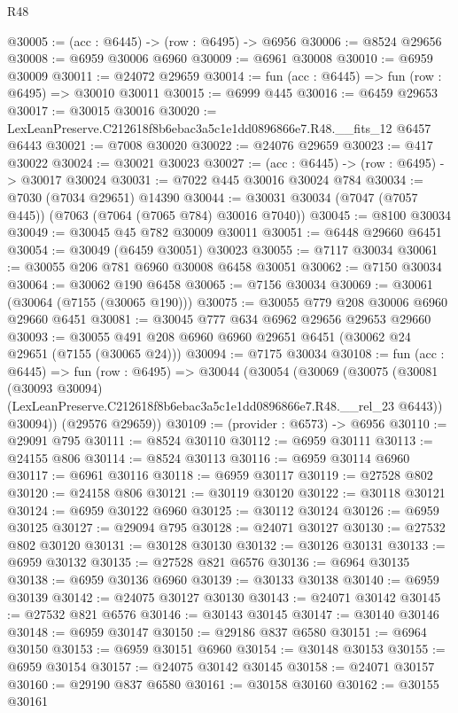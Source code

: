 \begin{lexlean}{R48}
\begin{coremodule}
@30005 := (acc : @6445) -> (row : @6495) -> @6956
@30006 := @8524 @29656
@30008 := @6959 @30006 @6960
@30009 := @6961 @30008
@30010 := @6959 @30009
@30011 := @24072 @29659
@30014 := fun (acc : @6445) => fun (row : @6495) => @30010 @30011
@30015 := @6999 @445
@30016 := @6459 @29653
@30017 := @30015 @30016
@30020 := LexLeanPreserve.C212618f8b6ebac3a5c1e1dd0896866e7.R48.__fits_12 @6457 @6443
@30021 := @7008 @30020
@30022 := @24076 @29659
@30023 := @417 @30022
@30024 := @30021 @30023
@30027 := (acc : @6445) -> (row : @6495) -> @30017 @30024
@30031 := @7022 @445 @30016 @30024 @784
@30034 := @7030 (@7034 @29651) @14390
@30044 := @30031 @30034 (@7047 (@7057 @445)) (@7063 (@7064 (@7065 @784) @30016 @7040))
@30045 := @8100 @30034
@30049 := @30045 @45 @782 @30009 @30011
@30051 := @6448 @29660 @6451
@30054 := @30049 (@6459 @30051) @30023
@30055 := @7117 @30034
@30061 := @30055 @206 @781 @6960 @30008 @6458 @30051
@30062 := @7150 @30034
@30064 := @30062 @190 @6458
@30065 := @7156 @30034
@30069 := @30061 (@30064 (@7155 (@30065 @190)))
@30075 := @30055 @779 @208 @30006 @6960 @29660 @6451
@30081 := @30045 @777 @634 @6962 @29656 @29653 @29660
@30093 := @30055 @491 @208 @6960 @6960 @29651 @6451 (@30062 @24 @29651 (@7155 (@30065 @24)))
@30094 := @7175 @30034
@30108 := fun (acc : @6445) =>
  fun (row : @6495) =>
  @30044
    (@30054
      (@30069
        (@30075
          (@30081
            (@30093 @30094)
            (LexLeanPreserve.C212618f8b6ebac3a5c1e1dd0896866e7.R48.__rel_23 @6443))
          @30094))
      (@29576 @29659))
@30109 := (provider : @6573) -> @6956
@30110 := @29091 @795
@30111 := @8524 @30110
@30112 := @6959 @30111
@30113 := @24155 @806
@30114 := @8524 @30113
@30116 := @6959 @30114 @6960
@30117 := @6961 @30116
@30118 := @6959 @30117
@30119 := @27528 @802
@30120 := @24158 @806
@30121 := @30119 @30120
@30122 := @30118 @30121
@30124 := @6959 @30122 @6960
@30125 := @30112 @30124
@30126 := @6959 @30125
@30127 := @29094 @795
@30128 := @24071 @30127
@30130 := @27532 @802 @30120
@30131 := @30128 @30130
@30132 := @30126 @30131
@30133 := @6959 @30132
@30135 := @27528 @821 @6576
@30136 := @6964 @30135
@30138 := @6959 @30136 @6960
@30139 := @30133 @30138
@30140 := @6959 @30139
@30142 := @24075 @30127 @30130
@30143 := @24071 @30142
@30145 := @27532 @821 @6576
@30146 := @30143 @30145
@30147 := @30140 @30146
@30148 := @6959 @30147
@30150 := @29186 @837 @6580
@30151 := @6964 @30150
@30153 := @6959 @30151 @6960
@30154 := @30148 @30153
@30155 := @6959 @30154
@30157 := @24075 @30142 @30145
@30158 := @24071 @30157
@30160 := @29190 @837 @6580
@30161 := @30158 @30160
@30162 := @30155 @30161

\end{coremodule}
\end{lexlean}
